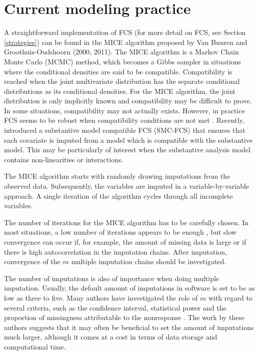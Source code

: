 \documentclass[10pt, fullpage, a4paper, titlepage]{article}
\begin{document}
\section{Current modeling practice}
\label{algor}
A straightforward implementation of FCS (for more detail on FCS, see Section \ref{strategies}) can be found in the MICE algorithm proposed by Van Buuren and Groothuis-Oudshoorn (2000, 2011)\nocite{van2000multivariate,vanbuuren2010}. The MICE algorithm is a Markov Chain Monte Carlo (MCMC) method, which becomes a Gibbs sampler in situations where the conditional densities are said to be compatible. Compatibility is reached when the joint multivariate distribution has the separate conditional distributions as its conditional densities. For the MICE algorithm, the joint distribution is only implicitly known and compatibility may be difficult to prove. In some situations, compatibility may not actually exists. However, in practice FCS seems to be robust when compatibility conditions are not met \citep{VanbuurenFCS}. Recently, \cite{Bartlett12022014} introduced a substantive model compatible FCS (SMC-FCS) that ensures that each covariate is imputed from a model which is compatible with the substantive model. This may be particularly of interest when the substantive analysis model contains non-linearities or interactions. 

The MICE algorithm starts with randomly drawing imputations from the observed data. Subsequently, the variables are imputed in a variable-by-variable approach. A single iteration of the algorithm cycles through all incomplete variables. 

The number of iterations for the MICE algorithm has to be carefully chosen. In most situations, a low number of iterations appears to be enough \citep{brand1999development, stef1999fcs}, but slow convergence can occur if, for example, the amount of missing data is large or if there is high autocorrelation in the imputation chains. After imputation, convergence of the $m$ multiple imputation chains should be investigated. 

The number of imputations is also of importance when doing multiple imputation. Usually, the default amount of imputations in software is set to be as low as three to five. Many authors have investigated the role of $m$ with regard to several criteria, such as the confidence interval, statistical power and the proportion of missingness attributable to the nonresponse \citep[see e.g.][]{royston2004multiple, graham2007many, bodner2008improves, white2011multiple}. The work by these authors suggests that it may often be beneficial to set the amount of imputations much larger, although it comes at a cost in terms of data storage and computational time.
\end{document}
